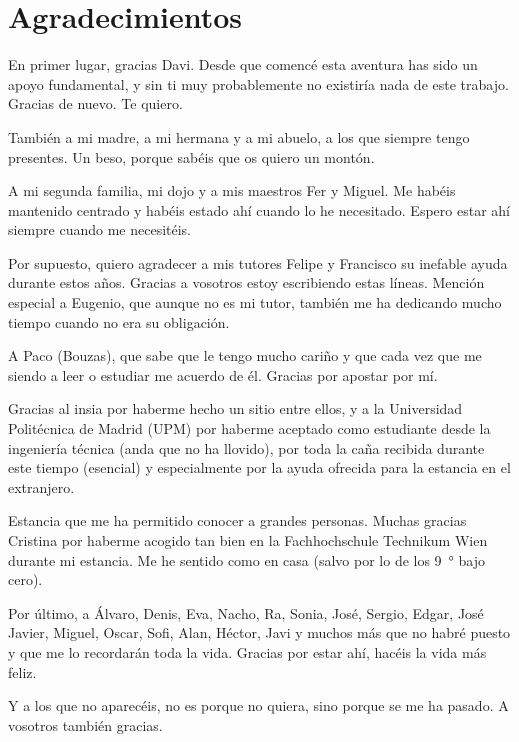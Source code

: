 \cleardoublepage
\thispagestyle{empty}
\chapter*{Agradecimientos}
\begin{fullwidth}
	En primer lugar, gracias Davi. Desde que comencé esta aventura has sido un apoyo fundamental, y sin ti muy probablemente no existiría nada de este trabajo. Gracias de nuevo. Te quiero.

	También a mi madre, a mi hermana y a mi abuelo, a los que siempre tengo presentes. Un beso, porque sabéis que os quiero un montón.
	
	A mi segunda familia, mi dojo y a mis maestros Fer y Miguel. Me habéis mantenido centrado y habéis estado ahí cuando lo he necesitado. Espero estar ahí siempre cuando me necesitéis.
	
	Por supuesto, quiero agradecer a mis tutores Felipe y Francisco su inefable ayuda durante estos años. Gracias a vosotros estoy escribiendo estas líneas. Mención especial a Eugenio, que aunque no es mi tutor, también me ha dedicando mucho tiempo cuando no era su obligación.

	A Paco (Bouzas), que sabe que le tengo mucho cariño y que cada vez que me siendo a leer o estudiar me acuerdo de él. Gracias por apostar por mí.
	
	Gracias al \Acrfull{insia} por haberme hecho un sitio entre ellos, y a la Universidad Politécnica de Madrid (UPM) por haberme aceptado como estudiante desde la ingeniería técnica (anda que no ha llovido), por toda la caña recibida durante este tiempo (esencial) y especialmente por la ayuda ofrecida para la estancia en el extranjero.
	
	Estancia que me ha permitido conocer a grandes personas. Muchas gracias Cristina por haberme acogido tan bien en la Fachhochschule Technikum Wien durante mi estancia. Me he sentido como en casa (salvo por lo de los \SI{9}{\degree} bajo cero).
	
	Por último, a Álvaro, Denis, Eva, Nacho, Ra, Sonia, José, Sergio, Edgar, José Javier, Miguel, Oscar, Sofi, Alan, Héctor, Javi y muchos más que no habré puesto y que me lo recordarán toda la vida. Gracias por estar ahí, hacéis la vida más feliz.

	Y a los que no aparecéis, no es porque no quiera, sino porque se me ha pasado. A vosotros también gracias.
\end{fullwidth}